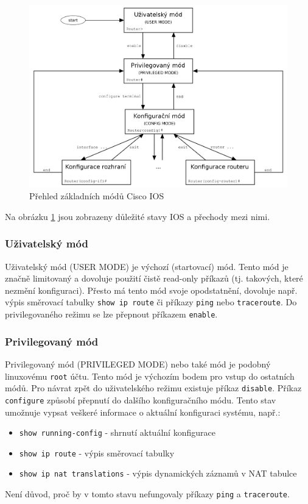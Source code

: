 \begin{figure}[h]
\begin{center}
\includegraphics[width=13cm]{figures/ios.png}
\caption{Přehled základních módů Cisco IOS \cite{wiki:ios}}
\label{fig:ios}
\end{center}
\end{figure}

Na obrázku \ref{fig:ios} jsou zobrazeny důležité stavy IOS a přechody mezi nimi. 

\subsubsection{Uživatelský mód}
Uživatelský mód (USER MODE) je výchozí (startovací) mód. Tento mód je značně limitovaný a dovoluje použití čistě read-only příkazů (tj. takových, které nezmění konfiguraci). Přesto má tento mód svoje opodstatnění, dovoluje např. výpis směrovací tabulky \verb|show ip route| či příkazy \verb|ping| nebo \verb|traceroute|. Do privilegovaného režimu se lze přepnout příkazem \verb|enable|.

\subsubsection{Privilegovaný mód}
Privilegovaný mód (PRIVILEGED MODE) nebo také  mód je podobný linuxovému \verb|root| účtu. Tento mód je výchozím bodem pro vstup do ostatních módů. Pro návrat zpět do uživatelského režimu existuje příkaz \verb|disable|. Příkaz \verb|configure| způsobí přepnutí do dalšího konfiguračního módu. Tento stav umožnuje vypsat veškeré informace o aktuální konfiguraci systému, např.:
\begin{itemize}
 \item \verb|show running-config| - shrnutí aktuální konfigurace
 \item \verb|show ip route| - výpis směrovací tabulky
 \item \verb|show ip nat translations| - výpis dynamických záznamů v NAT tabulce
\end{itemize}
Není důvod, proč by v tomto stavu nefungovaly příkazy \verb|ping| a \verb|traceroute|.

